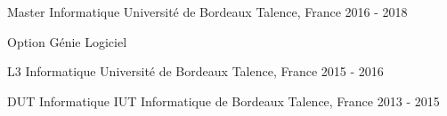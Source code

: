 \newpage
{}
\begin{cventries}
	\cventry
	{Master Informatique}
	{Université de Bordeaux}
	{Talence, France}
	{2016 - 2018}
	{
		\begin{cvitems}
			\item {Option Génie Logiciel}
		\end{cvitems}
	}

	\cventry
	{L3 Informatique}
	{Université de Bordeaux}
	{Talence, France}
	{2015 - 2016}
	{}

	\cventry
	{DUT Informatique}
	{IUT Informatique de Bordeaux}
	{Talence, France}
	{2013 - 2015}
	{}

\end{cventries}